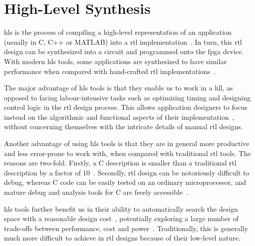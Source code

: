 \section{High-Level Synthesis}
\label{bg:sec:high_level_synthesis}

\Acrfull{hls} is the process of compiling a high-level representation
of an application (usually in C, C++ or MATLAB) into a \gls{rtl}
implementation~\cite{coussy, gajski}.  In turn, this \gls{rtl} design
can be synthesized into a circuit and programmed onto the \gls{fpga}
device.  With modern \gls{hls} tools, some applications are synthesized
to have similar performance when compared with hand-crafted \gls{rtl}
implementations~\cite{bdti}.

The major advantage of \gls{hls} tools is that they enable us to work in a
\gls{hll}, as opposed to facing labour-intensive tasks such as optimizing
timing and designing control logic in the \gls{rtl} design process.  This
allows application designers to focus instead on the algorithmic and functional
aspects of their implementation~\cite{coussy}, without concerning themselves
with the intricate details of manual \gls{rtl} designs.

Another advantage of using \gls{hls} tools is that they are in general
more productive and less error-prone to work with, when compared with
traditional \gls{rtl} tools.  The reasons are two-fold.  Firstly, a C
description is smaller than a traditional \gls{rtl} description by a factor
of 10~\cite{coussy, bdti}.  Secondly, \gls{rtl} design can be notoriously
difficult to debug, whereas C code can be easily tested on an ordinary
microprocessor, and mature debug and analysis tools for C are freely
accessible~\cite{canis13}.

\Gls{hls} tools further benefit us in their ability to automatically search
the design space with a reasonable design cost~\cite{bdti}, potentially
exploring a large number of trade-offs between performance, cost and
power~\cite{mcfarland}.  Traditionally, this is generally much more difficult
to achieve in \gls{rtl} designs because of their low-level nature.


